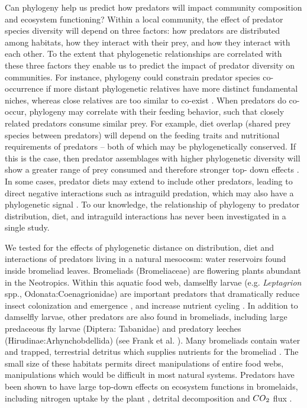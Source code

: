 \documentclass[11pt]{article}
\begin{document}
Can
phylogeny help us predict how predators will impact community composition and ecosystem functioning? Within a local community, the effect of predator species diversity will
depend on three factors: how predators are distributed among habitats,
how they interact with their prey, and how they interact with each other. To the extent that phylogenetic relationships are
correlated with these three factors they enable us to predict the impact
of predator diversity on communities. For instance, phylogeny could
constrain predator species co-occurrence if more distant phylogenetic
relatives have more distinct fundamental niches, whereas close relatives
are too similar to co-exist \citep{Webb2002, Emerson2008}. When
predators do co-occur, phylogeny may correlate with their feeding
behavior, such that closely related predators consume similar prey. For
example, diet overlap (shared prey species between predators) will
depend on the feeding traits and nutritional requirements of predators
-- both of which may be phylogenetically conserved. If this is the case,
then predator assemblages with higher phylogenetic diversity will show a
greater range of prey consumed and therefore stronger top- down effects
\citep{Finke2008a}. In some cases, predator diets may extend to include
other predators, leading to direct negative interactions such as
intraguild predation, which may also have a phylogenetic signal
\citep{Pfennig2000}. To our knowledge, the relationship of phylogeny to
predator distribution, diet, and intraguild interactions has never been
investigated in a single study.

We tested for the effects of phylogenetic distance on distribution, diet
and interactions of predators living in a natural mesocosm: water
reservoirs found inside bromeliad leaves. Bromeliads (Bromeliaceae) are
flowering plants abundant in the Neotropics. Within this aquatic food
web, damselfly larvae (e.g. \emph{Leptagrion} spp.,
Odonata:Coenagrionidae) are important predators that dramatically reduce
insect colonization \citep{Hammill2015} and emergence
\citep{Starzomski2010}, and increase nutrient cycling \citep{Ngai2006}.
In addition to damselfly larvae, other predators are also found in
bromeliads, including large predaceous fly larvae (Diptera: Tabanidae)
and predatory leeches (Hirudinae:Arhynchobdellida) (see Frank et al.
\citeyearpar{Frank2009}). Many bromeliads contain water and trapped,
terrestrial detritus which supplies nutrients for the bromeliad
\citep{Reich2003a}. The small size of these habitats permits direct
manipulations of entire food webs, manipulations which would be
difficult in most natural systems. Predators have been shown to have
large top-down effects on ecosystem functions in bromelaids, including
nitrogen uptake by the plant \citep{Ngai2006}, detrital decomposition
and $CO\textsubscript{2}$ flux \citep{Atwood2014, Atwood2013}.
\end{document}
